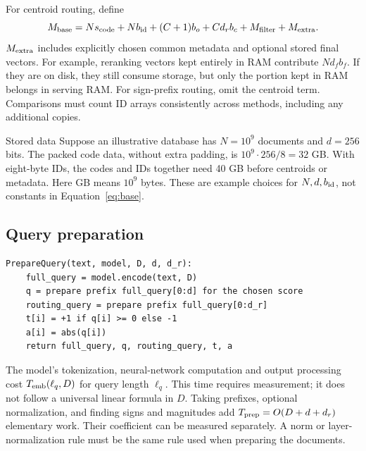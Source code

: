 For centroid routing, define
\begin{equation}
M_{\mathrm{base}}=N s_{\rm code}+N b_{\rm id}+(C+1)b_o+C d_r b_c+M_{\rm filter}+M_{\rm extra}.
\label{eq:base}
\end{equation}
$M_{\rm extra}$ includes explicitly chosen common metadata and optional stored final vectors.
For example, reranking vectors kept entirely in RAM contribute $N d_f b_f$. If they are on disk,
they still consume storage, but only the portion kept in RAM belongs in serving RAM. For
sign-prefix routing, omit the centroid term. Comparisons must count ID arrays consistently across
methods, including any additional copies.

\begin{examplebox}{Stored data}
Suppose an illustrative database has $N=10^9$ documents and $d=256$ bits. The packed code data,
without extra padding, is $10^9\cdot256/8=32$ GB. With eight-byte IDs, the codes and IDs together
need 40 GB before centroids or metadata. Here GB means $10^9$ bytes. These are example choices
for $N,d,b_{\rm id}$, not constants in Equation~\eqref{eq:base}.
\end{examplebox}

\subsection{Query preparation}
\par\noindent\begin{minipage}{\linewidth}
\begin{lstlisting}[caption={Query preparation shared by all methods.}]
PrepareQuery(text, model, D, d, d_r):
    full_query = model.encode(text, D)
    q = prepare prefix full_query[0:d] for the chosen score
    routing_query = prepare prefix full_query[0:d_r]
    t[i] = +1 if q[i] >= 0 else -1
    a[i] = abs(q[i])
    return full_query, q, routing_query, t, a
\end{lstlisting}
\end{minipage}\par
The model's tokenization, neural-network computation and output processing cost
$T_{\rm emb}(\ell_q,D)$ for query length $\ell_q$. This time requires measurement; it does not follow a universal
linear formula in $D$. Taking prefixes, optional normalization, and finding signs and magnitudes add
$T_{\rm prep}=O(D+d+d_r)$ elementary work. Their coefficient can be measured separately.
A norm or layer-normalization rule must be the same rule used when preparing the documents.


